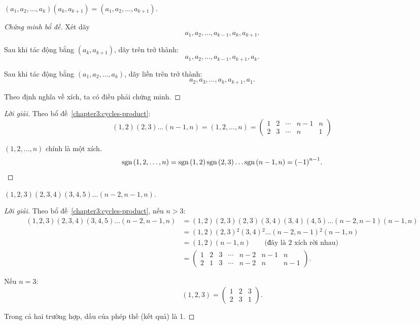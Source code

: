 \begin{lemma}\label{chapter3:cycles-product}
    $(a_{1}, a_{2}, \ldots, a_{k})(a_{k},a_{k+1}) = (a_{1},a_{2},\ldots, a_{k+1})$.
\end{lemma}

\begin{proof}[Chứng minh bổ đề]
    Xét dãy
    \[
        a_{1}, a_{2}, \ldots, a_{k-1}, a_{k}, a_{k+1}.
    \]
    
    Sau khi tác động bằng $(a_{k},a_{k+1})$, dãy trên trở thành:
    \[
        a_{1}, a_{2}, \ldots, a_{k-1}, a_{k+1}, a_{k}.
    \]
    
    Sau khi tác động bằng $(a_{1}, a_{2}, \ldots, a_{k})$, dãy liền trên trở thành:
    \[
        a_{2}, a_{3}, \ldots, a_{k}, a_{k+1}, a_{1}.
    \]

    Theo định nghĩa về xích, ta có điều phải chứng minh.
\end{proof}

\begin{proof}[Lời giải]
    Theo bổ đề~\ref{chapter3:cycles-product}:
    \[
        (1,2)(2,3)\ldots (n-1,n) = (1,2,\ldots,n)
        =
        \begin{pmatrix}
            1 & 2 & \cdots & n-1 & n \\
            2 & 3 & \cdots & n   & 1
        \end{pmatrix}
    \]
    
    $(1,2,\ldots, n)$ chính là một xích.
    \[
        \text{sgn}\left({1,2,\ldots,n}\right) = \text{sgn}\left({1,2}\right)\text{sgn}\left({2,3}\right)\ldots\text{sgn}\left({n-1,n}\right) = {(-1)}^{n-1}.
    \]
\end{proof}

\begin{exercise}
    $(1,2,3)(2,3,4)(3,4,5)\ldots (n-2,n-1,n)$.
\end{exercise}

\begin{proof}[Lời giải]
    Theo bổ đề~\ref{chapter3:cycles-product}, nếu $n > 3$:
    \begin{align*}
        (1,2,3)(2,3,4)(3,4,5)\ldots (n-2,n-1,n)
         & = (1,2)(2,3)(2,3)(3,4)(3,4)(4,5) \ldots (n-2,n-1)(n-1,n)   \\
         & = (1,2)(2,3){}^{2}(3,4){}^{2}\ldots (n-2,n-1){}^{2}(n-1,n) \\
         & = (1,2)(n-1,n)\qquad\text{(đây là 2 xích rời nhau)}        \\
         & =
        \begin{pmatrix}
            1 & 2 & 3 & \cdots & n-2 & n-1 & n   \\
            2 & 1 & 3 & \cdots & n-2 & n   & n-1
        \end{pmatrix}.
    \end{align*}
    
    Nếu $n = 3$:
    \[
        (1,2,3) =
        \begin{pmatrix}
            1 & 2 & 3 \\
            2 & 3 & 1
        \end{pmatrix}.
    \]
    
    Trong cả hai trường hợp, dấu của phép thế (kết quả) là 1.
\end{proof}

